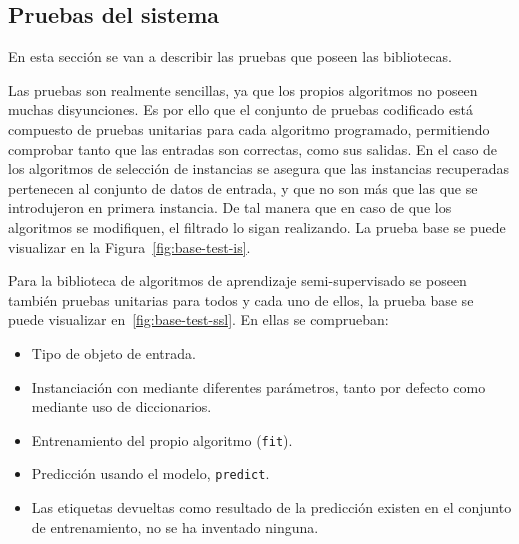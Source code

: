 
\subsection{Pruebas del sistema}

En esta sección se van a describir las pruebas que poseen las bibliotecas.

Las pruebas son realmente sencillas, ya que los propios algoritmos no poseen muchas disyunciones. Es por ello que el conjunto de pruebas codificado está compuesto de pruebas unitarias para cada algoritmo programado, permitiendo comprobar tanto que las entradas son correctas, como sus salidas. En el caso de los algoritmos de selección de instancias se asegura que las instancias recuperadas pertenecen al conjunto de datos de entrada, y que no son más que las que se introdujeron en primera instancia. De tal manera que en caso de que los algoritmos se modifiquen, el filtrado lo sigan realizando. La prueba base se puede visualizar en la Figura~\ref{fig:base-test-is}.

Para la biblioteca de algoritmos de aprendizaje semi-supervisado se poseen también pruebas unitarias para todos y cada uno de ellos, la prueba base se puede visualizar en~\ref{fig:base-test-ssl}. En ellas se comprueban:
\begin{itemize}
\tightlist
\item Tipo de objeto de entrada.
\item Instanciación con mediante diferentes parámetros, tanto por defecto como mediante uso de diccionarios.
\item Entrenamiento del propio algoritmo (\texttt{fit}).
\item Predicción usando el modelo, \texttt{predict}.
\item Las etiquetas devueltas como resultado de la predicción existen en el conjunto de entrenamiento, no se ha inventado ninguna.
\end{itemize}


